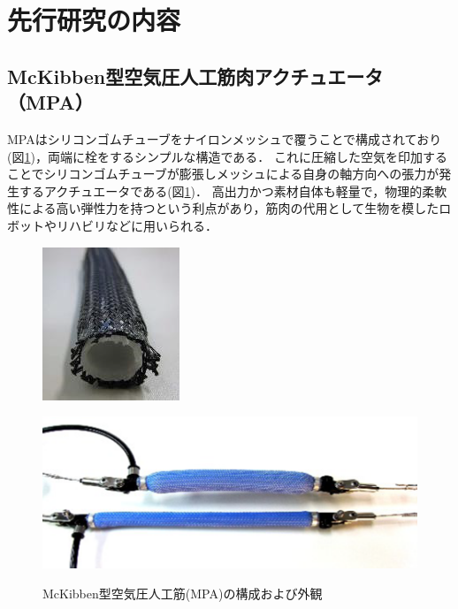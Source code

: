 \newpage
\section{先行研究の内容}
\subsection{McKibben型空気圧人工筋肉アクチュエータ（MPA）}
MPAはシリコンゴムチューブをナイロンメッシュで覆うことで構成されており(図\ref{fig:MPA})，両端に栓をするシンプルな構造である．
これに圧縮した空気を印加することでシリコンゴムチューブが膨張しメッシュによる自身の軸方向への張力が発生するアクチュエータである(図\ref{fig:MPA})．
高出力かつ素材自体も軽量で，物理的柔軟性による高い弾性力を持つという利点があり，筋肉の代用として生物を模したロボットやリハビリなどに用いられる\cite{2003722}．
\begin{figure}[b]
  \begin{minipage}{0.49\columnwidth}
    \vspace{4mm}
    \centering
    \includegraphics[scale=1]{image/MPA_kousei.png}
    \vspace{3mm}
    \label{fig:Structure}
  \end{minipage}
  \begin{minipage}{0.49\columnwidth}
    \vspace{10mm}
    \centering
    \includegraphics[scale=.8]{image/MPA_dousa.png}
    \vspace{10mm}
    \label{fig:move}
  \end{minipage}
  \caption{McKibben型空気圧人工筋(MPA)の構成および外観\cite{中西大輔2020}}
  \label{fig:MPA}
\end{figure}
